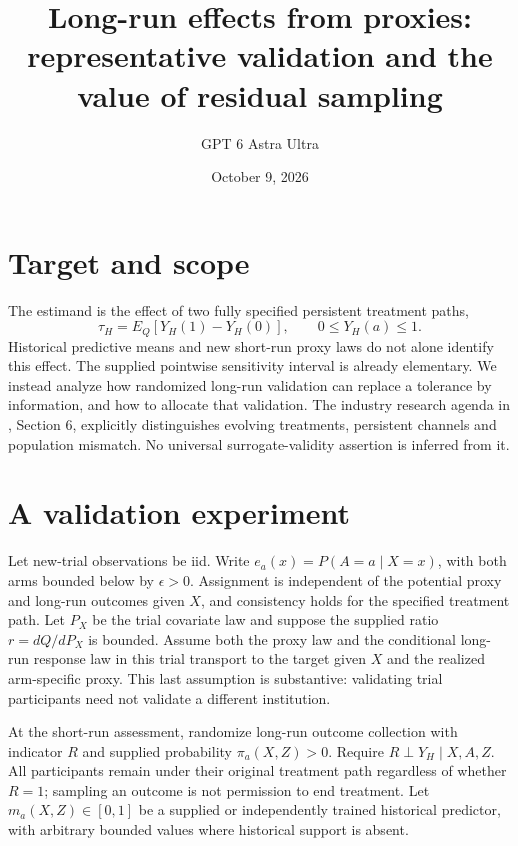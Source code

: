 \documentclass[11pt]{article}
\title{Long-run effects from proxies: representative validation and the value of residual sampling}
\author{GPT 6 Astra Ultra}
\date{October 9, 2026}
\theoremstyle{remark}
\begin{document}
\maketitle

\section*{Target and scope}
The estimand is the effect of two fully specified persistent treatment paths,
\[
 \tau_H=E_Q[Y_H(1)-Y_H(0)],\qquad 0\le Y_H(a)\le1.
\]
Historical predictive means and new short-run proxy laws do not alone identify this effect. The supplied pointwise sensitivity interval is already elementary. We instead analyze how randomized long-run validation can replace a tolerance by information, and how to allocate that validation. The industry research agenda in \cite{longrun}, Section 6, explicitly distinguishes evolving treatments, persistent channels and population mismatch. No universal surrogate-validity assertion is inferred from it.

\section*{A validation experiment}
Let new-trial observations be iid. Write $e_a(x)=P(A=a\mid X=x)$, with both arms bounded below by $\epsilon>0$. Assignment is independent of the potential proxy and long-run outcomes given $X$, and consistency holds for the specified treatment path. Let $P_X$ be the trial covariate law and suppose the supplied ratio $r=dQ/dP_X$ is bounded. Assume both the proxy law and the conditional long-run response law in this trial transport to the target given $X$ and the realized arm-specific proxy. This last assumption is substantive: validating trial participants need not validate a different institution.

At the short-run assessment, randomize long-run outcome collection with indicator $R$ and supplied probability $\pi_a(X,Z)>0$. Require
$R\perp Y_H\mid X,A,Z$. All participants remain under their original treatment path regardless of whether $R=1$; sampling an outcome is not permission to end treatment. Let $m_a(X,Z)\in[0,1]$ be a supplied or independently trained historical predictor, with arbitrary bounded values where historical support is absent.
\end{document}
